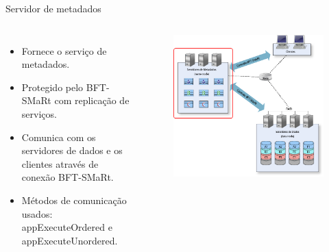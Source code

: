 \begin{frame}{Servidor de metadados}
	
	\begin{columns}
		\begin{itemize}
			\item Fornece o serviço de metadados.
			\item Protegido pelo BFT-SMaRt com replicação de serviços.
			\item Comunica com os servidores de dados e os clientes através de conexão BFT-SMaRt.
			\item Métodos de comunicação usados: appExecuteOrdered e appExecuteUnordered.
		\end{itemize}
		
		\begin{figure}
			\includegraphics[width=\textwidth]{imagens/visao_geral1}
		\end{figure}
	\end{columns}
\end{frame}

